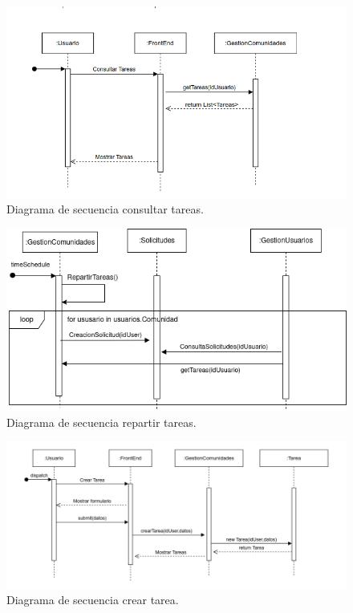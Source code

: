 \begin{figure}[H]
    \centering
    \includegraphics[width=\textwidth]{fotos/5-secuencia.png}
    \caption{Diagrama de secuencia consultar tareas.}
    \label{fig:diagrama_arquitectura}
\end{figure}
\begin{figure}[H]
    \centering
    \includegraphics[width=\textwidth]{fotos/6-secuencia.png}
    \caption{Diagrama de secuencia repartir tareas.}
    \label{fig:diagrama_arquitectura}
\end{figure}
\begin{figure}[H]
    \centering
    \includegraphics[width=\textwidth]{fotos/final-secuencia.png}
    \caption{Diagrama de secuencia crear tarea.}
    \label{fig:diagrama_arquitectura}
\end{figure}

